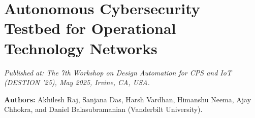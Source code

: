 \chapter{Autonomous Cybersecurity Testbed for Operational Technology Networks}
\label{APP_OTSecurity}

\noindent\textit{Published at: The 7th Workshop on Design Automation for CPS and IoT (DESTION '25), May 2025, Irvine, CA, USA.}

\noindent\textbf{Authors:} Akhilesh Raj, Sanjana Das, Harsh Vardhan, Himanshu Neema, Ajay Chhokra, and Daniel Balasubramanian (Vanderbilt University).


\graphicspath{{castle2025_otsecurity/}}








